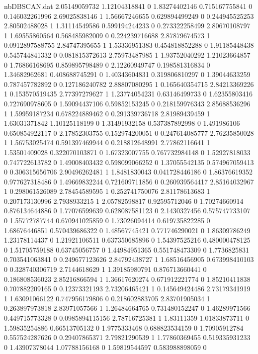 \begin{filecontents}{nbDBSCAN.dat}
2.05149059732 1.12104318841 0
1.83274402146 0.715167755841 0
0.146032261996 2.69025838146 1
1.56667246655 0.629894499249 0
0.244945525253 2.80502488028 1
1.31114549586 0.599194244233 0
0.273322258499 2.80670108797 1
1.69555860564 0.568485982009 0
0.224239716688 2.87879674573 1
0.0912897588755 2.84747395655 1
1.53336951383 0.454818852288 0
1.91185448438 0.545744841332 0
0.081815372613 2.75973487985 1
1.93752040292 1.21023664857 0
1.76866168695 0.859895798489 0
2.12260949747 0.198581316834 0
1.34682962681 0.408688745291 0
1.40343604831 0.319806810297 0
1.39044633259 0.787457782892 0
0.127186240782 2.88807080295 1
0.165640354715 2.84213369226 1
0.153570519435 2.77397279627 1
1.23774054231 0.63146499733 0
1.62355803416 0.727690978605 0
1.59094437106 0.59852153245 0
0.218159976343 2.85688536296 1
1.59959187234 0.678224889462 0
0.291339736718 2.81989439459 1
1.63031371842 1.10125118199 0
1.31491932158 0.537387892998 0
1.491986106 0.650854922117 0
2.17852303755 0.152974200051 0
0.247614085777 2.76235850028 1
1.56753025474 0.591397469944 0
0.218812648991 2.77862116641 1
1.53501409028 0.322070103871 0
1.67323007755 0.767732984148 0
1.52927818033 0.747722613782 0
1.49008403432 0.598099066252 0
1.37055542135 0.574967059413 0
0.306315656706 2.90496262481 1
1.8481830043 0.041728446186 0
1.86376619352 0.977627318486 0
1.49669832244 0.721609711856 0
0.260939564417 2.85164032967 1
0.298061526089 2.78454589595 1
0.252741750076 2.81178613683 1
0.207173130996 2.7938933215 1
2.05782598817 0.92595712046 0
1.70274660914 0.876134644886 0
1.77076599639 0.628087581123 0
2.1430327456 0.575747733107 0
1.55772787744 0.670941025859 0
1.73026094414 0.619735822285 0
1.68676446851 0.570439686322 0
1.48567745421 0.771746290021 0
1.86309786249 1.23178114437 0
1.21921106511 0.637350685896 0
1.54397525216 0.480000478125 0
1.51705759188 0.63745056757 0
1.44984951365 0.551748473309 0
1.7736825831 0.703541063841 0
0.249677123626 2.84792438727 1
1.68516456905 0.673998410103 0
0.328740306719 2.7144618629 1
1.39185980791 0.876713660441 0
0.186808536023 2.85216866594 1
1.36617620274 0.671912221774 0
1.85210411838 0.707882209165 0
0.12373321193 2.73206465421 1
0.145649424486 2.73179341919 1
1.63091066122 0.747956179806 0
0.218602883705 2.83701905034 1
0.263897973818 2.83971057566 1
1.26484664765 0.731480152247 0
1.46289971566 0.449715773328 0
0.0985894115156 2.78716725381 1
1.83111359 1.01833873711 0
1.59835254886 0.66513705132 0
1.9775333468 0.688823534159 0
1.70905912784 0.557524287626 0
0.29407865371 2.79821290539 1
1.77860369455 0.519335931233 0
1.43907378044 1.07788156168 0
1.59819544597 0.583988898059 0

\end{filecontents}
